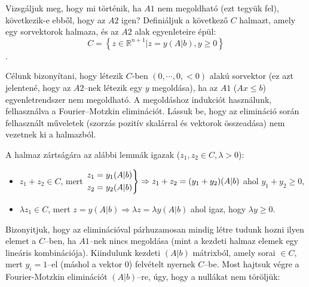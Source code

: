 Vizsgáljuk meg, hogy mi történik, ha $A1$ nem megoldható (ezt tegyük fel),
következik-e ebből, hogy az $A2$ igen? Definiáljuk a következő $C$ halmazt,
amely egy sorvektorok halmaza, és az $A2$ alak egyenleteire épül: \[ C= \left\{
	z \in \mathbb{R}^{n+1} | z = y (A|b), y \geq 0 \right\}\].

Célunk bizonyítani, hogy létezik $C$-ben $(0, \cdots, 0 , <0)$ alakú sorvektor
(ez azt jelentené, hogy az $A2$--nek létezik egy $y$ megoldása), ha az $A1$
($Ax \leq b$) egyenletrendszer nem megoldható. A megoldáshoz indukciót
használunk, felhasználva a Fourier--Motzkin eliminációt. Lássuk be, hogy az
elimináció során felhasznált műveletek (szorzás pozitív skalárral és vektorok
összeadása) nem vezetnek ki a halmazból.

A halmaz zártságára az alábbi lemmák igazak ($z_1, z_2 \in C, \lambda>0$):

\begin{itemize}
	\item $z_1+z_2 \in C$, mert $\begin{rcases}
			      z_1=y_1(A|b) \\
			      z_2=y_2(A|b)\end{rcases} \Rightarrow z_1+z_2=(y_1+y_2)(A|b)$ ahol $y_1+y_2 \geq 0,$
	\item $\lambda z_1 \in C$, mert $
		      z=y(A|b) \Rightarrow \lambda z = \lambda y (A|b)$ ahol igaz, hogy $\lambda y \geq 0$.
\end{itemize}

Bizonyitjuk, hogy az eliminációval párhuzamosan mindig létre tudunk hozni ilyen
elemet a $C$--ben, ha $A1$--nek nincs megoldása (mint a kezdeti halmaz elemek
egy lineáris kombinációja). Kiindulunk kezdeti $(A|b)$ mátrixból, amely sorai
$\in C$, mert $y_i=1$--el (máshol a vektor $0$) felvételt nyernek $C$--be. Most
hajtsuk végre a Fourier-Motzkin eliminációt $(A|b)$--re, úgy, hogy a nullákat
nem töröljük:

